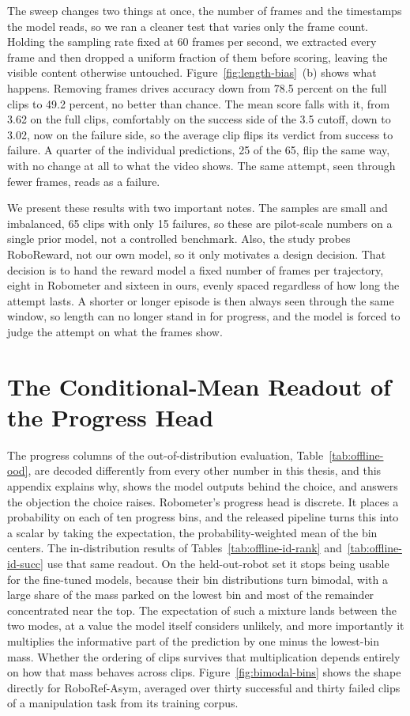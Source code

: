 The sweep changes two things at once, the number of frames and the timestamps the model reads, so we ran a cleaner test that varies only the frame count. Holding the sampling rate fixed at 60 frames per second, we extracted every frame and then dropped a uniform fraction of them before scoring, leaving the visible content otherwise untouched. Figure~\ref{fig:length-bias}~(b) shows what happens. Removing frames drives accuracy down from 78.5 percent on the full clips to 49.2 percent, no better than chance. The mean score falls with it, from 3.62 on the full clips, comfortably on the success side of the 3.5 cutoff, down to 3.02, now on the failure side, so the average clip flips its verdict from success to failure. A quarter of the individual predictions, 25 of the 65, flip the same way, with no change at all to what the video shows. The same attempt, seen through fewer frames, reads as a failure.

We present these results with two important notes. The samples are small and imbalanced, 65 clips with only 15 failures, so these are pilot-scale numbers on a single prior model, not a controlled benchmark. Also, the study probes RoboReward, not our own model, so it only motivates a design decision. That decision is to hand the reward model a fixed number of frames per trajectory, eight in Robometer and sixteen in ours, evenly spaced regardless of how long the attempt lasts. A shorter or longer episode is then always seen through the same window, so length can no longer stand in for progress, and the model is forced to judge the attempt on what the frames show.

\chapter{The Conditional-Mean Readout of the Progress Head}
\label{apx:condmean}

The progress columns of the out-of-distribution evaluation, Table~\ref{tab:offline-ood}, are decoded differently from every other number in this thesis, and this appendix explains why, shows the model outputs behind the choice, and answers the objection the choice raises. Robometer's progress head is discrete. It places a probability on each of ten progress bins, and the released pipeline turns this into a scalar by taking the expectation, the probability-weighted mean of the bin centers. The in-distribution results of Tables~\ref{tab:offline-id-rank} and~\ref{tab:offline-id-succ} use that same readout. On the held-out-robot set it stops being usable for the fine-tuned models, because their bin distributions turn bimodal, with a large share of the mass parked on the lowest bin and most of the remainder concentrated near the top. The expectation of such a mixture lands between the two modes, at a value the model itself considers unlikely, and more importantly it multiplies the informative part of the prediction by one minus the lowest-bin mass. Whether the ordering of clips survives that multiplication depends entirely on how that mass behaves across clips. Figure~\ref{fig:bimodal-bins} shows the shape directly for RoboRef-Asym, averaged over thirty successful and thirty failed clips of a manipulation task from its training corpus.

